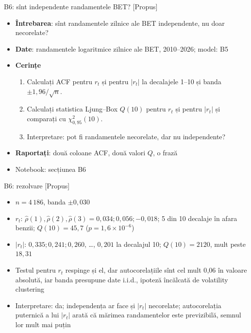 \begin{frame}{B6: sînt independente randamentele BET? [Propus]}
\itemsize{\footnotesize}
\begin{itemize}
\item \textbf{Întrebarea}: sînt randamentele zilnice ale BET independente, nu doar necorelate?
\item \textbf{Date}: randamentele logaritmice zilnice ale BET, 2010--2026; model: B5
\item \textbf{Cerințe}
\begin{enumerate}
    \item Calculați ACF pentru $r_t$ și pentru $|r_t|$ la decalajele 1--10 și banda $\pm 1{,}96/\sqrt n$.
    \item Calculați statistica Ljung--Box $Q(10)$ pentru $r_t$ și pentru $|r_t|$ și comparați cu $\chi^2_{0{,}95}(10)$.
    \item Interpretare: pot fi randamentele necorelate, dar nu independente?
\end{enumerate}
\item \textbf{Raportați}: două coloane ACF, două valori $Q$, o frază
\item Notebook: secțiunea B6
\end{itemize}
\end{frame}

\ifsolutions
\begin{frame}{B6: rezolvare [Propus]}
\itemsize{\footnotesize}
\begin{itemize}
    \item $n = 4\,186$, banda $\pm 0{,}030$
    \item $r_t$: $\hat\rho(1), \hat\rho(2), \hat\rho(3) = 0{,}034; 0{,}056; -0{,}018$; 5 din 10 decalaje în afara benzii; $Q(10) = 45{,}7$ ($p = 1{,}6 \times 10^{-6}$)
    \item $|r_t|$: $0{,}335; 0{,}241; 0{,}260$, \dots, $0{,}201$ la decalajul 10; $Q(10) = 2120$, mult peste $18{,}31$
    \item Testul pentru $r_t$ respinge și el, dar autocorelațiile sînt cel mult 0{,}06 în valoare absolută, iar banda presupune date i.i.d., ipoteză încălcată de volatility clustering
    \item Interpretare: da; independența ar face și $|r_t|$ necorelate; autocorelația puternică a lui $|r_t|$ arată că mărimea randamentelor este previzibilă, semnul lor mult mai puțin
\end{itemize}
\end{frame}
\fi

